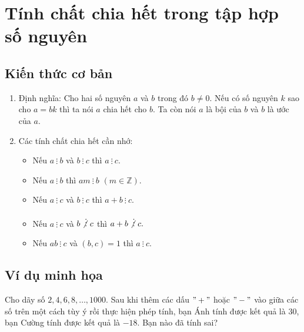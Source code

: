 
\section{Tính chất chia hết trong tập hợp số nguyên}	
\subsection{Kiến thức cơ bản}
\begin{enumerate}
	\item Định nghĩa: Cho hai số nguyên $a$ và $b$ trong đó $b \neq 0.$ Nếu có số nguyên $k$ sao cho $a=bk$ thì ta nói $a$ chia hết cho $b.$ Ta còn nói $a$ là bội của $b$ và $b$ là ước của $a.$
	\item Các tính chất chia hết cần nhớ:
	\begin{itemize}
		\item Nếu $a \ \vdots \ b$ và $b \ \vdots \ c$ thì $a \ \vdots \ c.$ 
		\item Nếu $a \ \vdots \ b$ thì $am \ \vdots \ b$ $(m \in \mathbb{Z}).$ 
		\item Nếu $a \ \vdots \ c$ và $b \ \vdots \ c$ thì $a + b \ \vdots \ c.$ 
		\item Nếu $a \ \vdots \ c$ và $b \not \vdots \ c$ thì $a + b \not \vdots \ c.$ 
		\item Nếu $ab \ \vdots \ c$ và $(b,c) = 1$ thì $a \ \vdots \ c.$ 
	\end{itemize}
\end{enumerate}
\subsection{Ví dụ minh họa}
\begin{vd}
	Cho dãy số $2, 4, 6, 8, \dots, 1000.$ Sau khi thêm các dấu $"+"$ hoặc $"-"$ vào giữa các số trên một cách tùy ý rồi thực hiện phép tính, bạn Ánh tính được kết quả là $30$, bạn Cường tính được kết quả là $-18.$ Bạn nào đã tính sai?
\end{vd}

